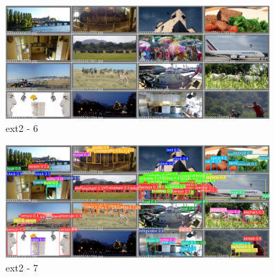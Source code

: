 \documentclass[10pt,UTF8]{ctexart}
\begin{document}
\begin{figure}[H]
\centering 
\includegraphics[width=0.90\textwidth]{ex26.jpg} 
\caption{ext2 - 6}
\label{Test}
\end{figure}

\begin{figure}[H]
\centering 
\includegraphics[width=0.90\textwidth]{ex27.jpg} 
\caption{ext2 - 7}
\label{Test}
\end{figure}







\clearpage
\end{document}

